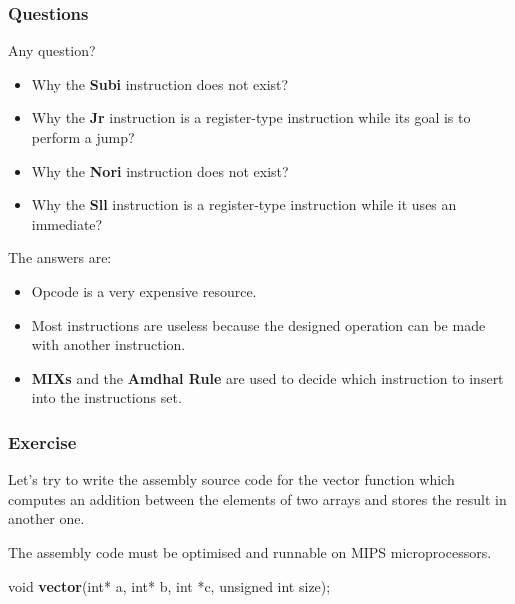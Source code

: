\begin{frame}
  \frametitle{Questions}

  Any question?

  \begin{itemize}[<+->]
    \item
      Why the \textbf{Subi} instruction does not exist?
    \item
      Why the \textbf{Jr} instruction is a register-type instruction
      while its goal is to perform a jump?
    \item
      Why the \textbf{Nori} instruction does not exist?
    \item
      Why the \textbf{Sll} instruction is a register-type instruction
      while it uses an immediate?
  \end{itemize}

  The answers are:

  \begin{itemize}[<+->]
    \item
      Opcode is a very expensive resource.
    \item
      Most instructions are useless because the designed operation can be
      made with another instruction.
    \item
      \textbf{MIXs} and the \textbf{Amdhal Rule} are used to decide which
      instruction to insert into the instructions set.
  \end{itemize}
\end{frame}

%
%

\begin{frame}
  \frametitle{Exercise}

  Let's try to write the assembly source code for the vector function
  which computes an addition between the elements of two arrays and stores
  the result in another one.

  \nl

  The assembly code must be optimised and runnable on MIPS microprocessors.

  \nl

  void \textbf{vector}(int* a, int* b, int *c, unsigned int size);
\end{frame}

%
%

